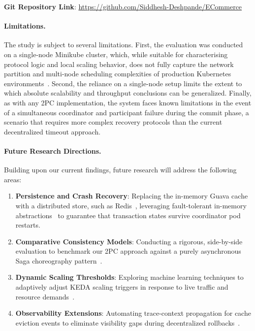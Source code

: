 \documentclass[]{USG}
\begin{document}
\vspace{1em}

\textbf{Git Repository Link}: \url{https://github.com/Siddhesh-Deshpande/ECommerce}
\paragraph{Limitations.}
The study is subject to several limitations. First, the evaluation was conducted on a single-node Minikube cluster, which, while suitable for characterising protocol logic and local scaling behavior, does not fully capture the network partition and multi-node scheduling complexities of production Kubernetes environments~\cite{verma2015large}. Second, the reliance on a single-node setup limits the extent to which absolute scalability and throughput conclusions can be generalized. Finally, as with any 2PC implementation, the system faces known limitations in the event of a simultaneous coordinator and participant failure during the commit phase, a scenario that requires more complex recovery protocols than the current decentralized timeout approach.

\paragraph{Future Research Directions.}
Building upon our current findings, future research will address the following areas:
\begin{enumerate}
  \item \textbf{Persistence and Crash Recovery}: Replacing the in-memory Guava cache with a distributed store, such as Redis~\cite{carlson2013redis}, leveraging fault-tolerant in-memory abstractions~\cite{zaharia2012resilient} to guarantee that transaction states survive coordinator pod restarts.
  \item \textbf{Comparative Consistency Models}: Conducting a rigorous, side-by-side evaluation to benchmark our 2PC approach against a purely asynchronous Saga choreography pattern~\cite{vogel2009eventual}.
  \item \textbf{Dynamic Scaling Thresholds}: Exploring machine learning techniques to adaptively adjust KEDA scaling triggers in response to live traffic and resource demands~\cite{stoica2018ray}.
  \item \textbf{Observability Extensions}: Automating trace-context propagation for cache eviction events to eliminate visibility gaps during decentralized rollbacks~\cite{dapper2010}.
\end{enumerate}





\end{document}
